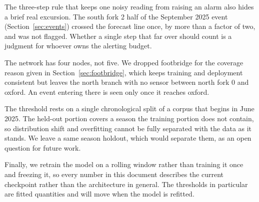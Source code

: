\documentclass{article}
\begin{document}
The three-step rule that keeps one noisy reading from raising an alarm also
hides a brief real excursion. The south fork 2 half of the September 2025
event (Section~\ref{sec:events}) crossed the forecast line once, by more than
a factor of two, and was not flagged. Whether a single step that far over
should count is a judgment for whoever owns the alerting budget.

The network has four nodes, not five. We dropped footbridge for the coverage
reason given in Section~\ref{sec:footbridge}, which keeps training and
deployment consistent but leaves the north branch with no sensor between north
fork 0 and oxford. An event entering there is seen only once it reaches oxford.

The threshold rests on a single chronological split of a corpus that begins in
June 2025. The held-out portion covers a season the training portion does not
contain, so distribution shift and overfitting cannot be fully separated with
the data as it stands. We leave a same season holdout, which would separate
them, as an open question for future work.

Finally, we retrain the model on a rolling window rather than training it once
and freezing it, so every number in this document describes the current
checkpoint rather than the architecture in general. The thresholds in
particular are fitted quantities and will move when the model is refitted.



\end{document}
